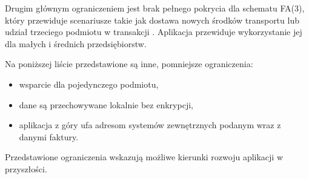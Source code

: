 Drugim głównym ograniczeniem jest brak pełnego pokrycia dla schematu FA(3), który przewiduje scenariusze takie jak dostawa nowych środków transportu lub udział trzeciego podmiotu w transakcji \parencite{structured_invoice_2025}. Aplikacja przewiduje wykorzystanie jej dla małych i średnich przedsiębiorstw.

Na poniższej liście przedstawione są inne, pomniejsze ograniczenia:
\begin{itemize}
    \item wsparcie dla pojedynczego podmiotu,
    \item dane są przechowywane lokalnie bez enkrypcji,
    \item aplikacja z góry ufa adresom systemów zewnętrznych podanym wraz z danymi faktury.
\end{itemize}

Przedstawione ograniczenia wskazują możliwe kierunki rozwoju aplikacji w przyszłości.
